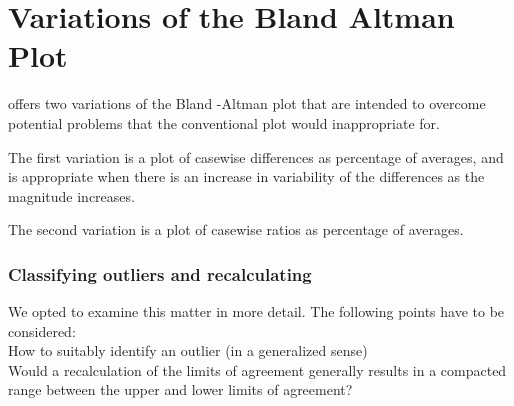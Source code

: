 \documentclass[12pt, a4paper]{report}
\begin{document}
\section{Variations of the Bland Altman Plot}
\citet{BA99} offers two variations of the Bland -Altman plot that
are intended to overcome potential problems that the conventional
plot would inappropriate for.

The first variation is a plot of casewise differences as
percentage of averages, and is appropriate when there is an
increase in variability of the differences as the magnitude
increases.




The second variation is a plot of casewise ratios as percentage of
averages.


\newpage








\subsubsection{Classifying outliers and recalculating} We opted to
examine this matter in more detail. The following points have to
be considered:
\\
 \indent How to suitably identify an outlier (in a generalized sense)
\\
\indent Would a recalculation of the limits of agreement generally
results in  a compacted range between the upper and lower limits
of agreement?


\end{document}
